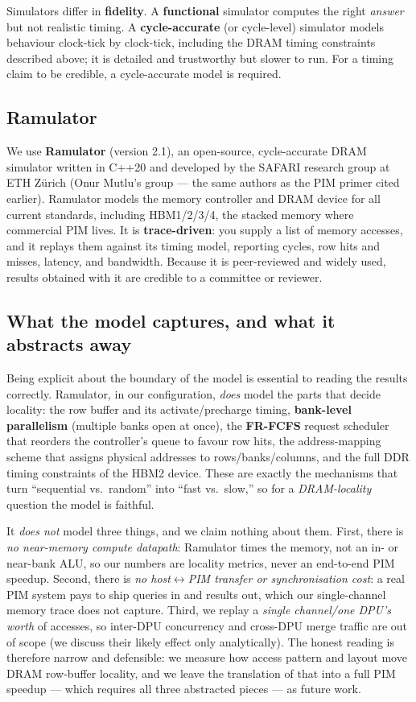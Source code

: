 \documentclass[11pt,a4paper]{article}
\newcommand{\term}[1]{\textbf{\color{slate}#1}}
\begin{document}
Simulators differ in \term{fidelity}. A \term{functional} simulator computes the right \emph{answer}
but not realistic timing. A \term{cycle-accurate} (or cycle-level) simulator models behaviour
clock-tick by clock-tick, including the DRAM timing constraints described above; it is detailed and
trustworthy but slower to run. For a timing claim to be credible, a cycle-accurate model is
required.

\subsection{Ramulator}

We use \term{Ramulator} (version 2.1), an open-source, cycle-accurate DRAM simulator written in
C++20 and developed by the SAFARI research group at ETH Z\"urich (Onur Mutlu's group --- the same
authors as the PIM primer cited earlier). Ramulator models the memory controller and DRAM device
for all current standards, including HBM1/2/3/4, the stacked memory where commercial PIM lives. It
is \term{trace-driven}: you supply a list of memory accesses, and it replays them against its timing
model, reporting cycles, row hits and misses, latency, and bandwidth. Because it is peer-reviewed
and widely used, results obtained with it are credible to a committee or reviewer.

\subsection{What the model captures, and what it abstracts away}
\label{sec:modelscope}

Being explicit about the boundary of the model is essential to reading the results correctly.
Ramulator, in our configuration, \emph{does} model the parts that decide locality: the row buffer
and its activate/precharge timing, \term{bank-level parallelism} (multiple banks open at once), the
\term{FR-FCFS} request scheduler that reorders the controller's queue to favour row hits, the
address-mapping scheme that assigns physical addresses to rows/banks/columns, and the full DDR
timing constraints of the HBM2 device. These are exactly the mechanisms that turn ``sequential
vs.\ random'' into ``fast vs.\ slow,'' so for a \emph{DRAM-locality} question the model is faithful.

It \emph{does not} model three things, and we claim nothing about them. First, there is \emph{no
near-memory compute datapath}: Ramulator times the memory, not an in- or near-bank ALU, so our
numbers are locality metrics, never an end-to-end PIM speedup. Second, there is \emph{no
host$\leftrightarrow$PIM transfer or synchronisation cost}: a real PIM system pays to ship queries in
and results out, which our single-channel memory trace does not capture. Third, we replay a
\emph{single channel/one DPU's worth} of accesses, so inter-DPU concurrency and cross-DPU merge
traffic are out of scope (we discuss their likely effect only analytically). The honest reading is
therefore narrow and defensible: we measure how access pattern and layout move DRAM row-buffer
locality, and we leave the translation of that into a full PIM speedup --- which requires all three
abstracted pieces --- as future work.
\end{document}
